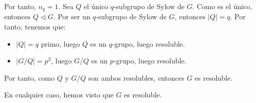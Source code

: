 \begin{ejercicio}
\begin{itemize}
        Por tanto, $n_q=1$. Sea $Q$ el único $q$-subgrupo de Sylow de $G$. Como es el único, entonces $Q\lhd G$. Por ser un $q$-subgrupo de Sylow de $G$, entonces $|Q|=q$. Por tanto, tenemos que:
        \begin{itemize}
            \item $|Q|=q$ primo, luego $Q$ es un $q$-grupo, luego resoluble.
            \item $|G/Q|=p^2$, luego $G/Q$ es un $p$-grupo, luego resoluble.
        \end{itemize}
        Por tanto, como $Q$ y $G/Q$ son ambos resolubles, entonces $G$ es resoluble.
    \end{itemize}
    
    En cualquier caso, hemos visto que $G$ es resoluble.
\end{ejercicio}

